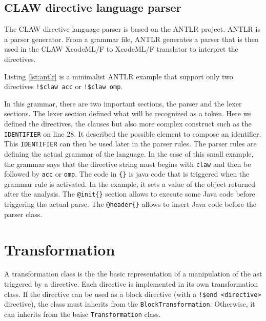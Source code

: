\documentclass[a4paper, 11pt]{report}
\def\xcodeml{XcodeML/F\xspace}
\begin{document}
\section{CLAW directive language parser}
The CLAW directive language parser is based on the ANTLR project. ANTLR is a parser generator. From a grammar file, ANTLR generates a parser that is then used in the CLAW \xcodeml to \xcodeml translator to interpret the directives. 



Listing \ref{lst:antlr} is a minimalist ANTLR example that support only two directives \lstinline|!$claw acc| or \lstinline|!$claw omp|.

In this grammar, there are two important sections, the parser and the lexer sections. The lexer section defined what will be recognized as a token. Here we defined the directives, the clauses but also more complex construct such as the \lstinline|IDENTIFIER| on line 28. It described the possible element to compose an identifier. This \lstinline|IDENTIFIER| can then be used later in the parser rules. 
The parser rules are defining the actual grammar of the language. In the case of this small example, the grammar says that the directive string must begins with \lstinline|claw| and then be followed by \lstinline|acc| or \lstinline|omp|. The code in \lstinline|{}| is java code that is triggered when the grammar rule is activated. In the example, it sets a value of the object returned after the analysis.
The \lstinline|@init{}| section allows to execute some Java code before triggering the actual parse. The \lstinline|@header{}| allows to insert Java code before the parser class.

\chapter{Transformation}
A transformation class is the the basic representation of a manipulation of the \gls{ast} triggered by a directive. Each directive is implemented in its own transformation class. If the directive can be used as a block directive (with a \lstinline|!$end <directive>| directive), the class must inherits from the \lstinline!BlockTransformation!. Otherwise, it can inherits from the baisc \lstinline!Transformation! class.
\end{document}

